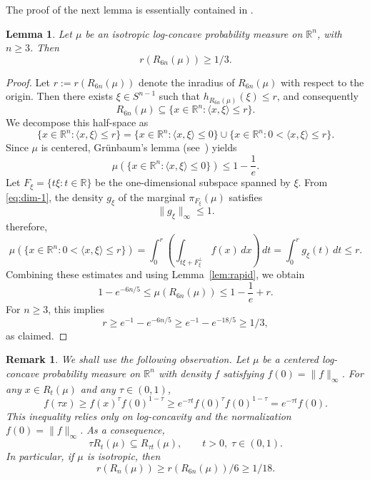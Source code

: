 \documentclass[11pt,leqno]{article}
\newtheorem{lemma}[theorem]{Lemma}
\newtheorem{remark}[theorem]{Remark}
\theoremstyle{remark}
\numberwithin{equation}{section}
\newcommand{\ls}{\leqslant}
\newcommand{\gr}{\geqslant}
\begin{document}
The proof of the next lemma is essentially contained in \cite[Lemma~5.4]{Klartag-2007}. 

\begin{lemma}\label{lem:inradius}
Let $\mu$ be an isotropic log-concave probability measure on $\mathbb{R}^n$, with $n\gr 3$. Then
$$r(R_{6n}(\mu))\gr 1/3.$$
\end{lemma}

\begin{proof}Let $r:=r(R_{6n}(\mu))$ denote the inradius of $R_{6n}(\mu)$ with respect to the origin. Then there exists $\xi\in S^{n-1}$ such that
$h_{R_{6n}(\mu)}(\xi)\ls r$, and consequently
$$R_{6n}(\mu)\subseteq \{x\in\mathbb{R}^n:\langle x,\xi\rangle \ls r\}.$$
We decompose this half-space as
$$\{x\in\mathbb{R}^n:\langle x,\xi\rangle \ls r\}=\{x\in\mathbb{R}^n:\langle x,\xi\rangle \ls 0\}\cup \{x\in\mathbb{R}^n:0<\langle x,\xi\rangle \ls r\}.$$
Since $\mu$ is centered, Gr\"{u}nbaum's lemma (see~\cite[Lemma~2.2.6]{BGVV-book}) yields 
$$\mu(\{x\in\mathbb{R}^n:\langle x,\xi\rangle\ls 0\})\ls 1-\frac{1}{e}.$$
Let $F_{\xi}=\{t\xi:t\in\mathbb{R}\}$ be the one-dimensional subspace spanned by $\xi$. From \eqref{eq:dim-1},
the density $g_{\xi}$ of the marginal $\pi_{F_{\xi}}(\mu)$ satisfies
\begin{equation*}\|g_{\xi}\|_{\infty}\ls 1.\end{equation*}
therefore,
$$\mu(\{x\in\mathbb{R}^n:0<\langle x,\xi\rangle\ls r\})=\int_0^r\left(\int_{t\xi +F_{\xi}^{\perp}}f(x)\,dx\right)\,dt=\int_0^rg_{\xi}(t)\,dt\ls r.$$
Combining these estimates and using Lemma~\ref{lem:rapid}, we obtain
$$1-e^{-6n/5}\ls \mu(R_{6n}(\mu))\ls 1-\frac{1}{e}+r.$$
For $n\gr 3$, this implies 
$$r\gr e^{-1}-e^{-6n/5}\gr e^{-1}-e^{-18/5}\gr 1/3,$$
as claimed.\end{proof}

\begin{remark}\label{rem:18}\rm We shall use the following observation. Let $\mu$ be a centered log-concave probability measure 
on $\mathbb{R}^n$ with density $f$ satisfying $f(0)=\|f\|_{\infty}$. For any $x\in R_t(\mu)$ and any $\tau\in (0,1)$, 
\begin{equation}\label{eq:scaling}f(\tau x)\gr f(x)^{\tau}f(0)^{1-\tau}\gr e^{-\tau t}f(0)^{\tau}f(0)^{1-\tau}=e^{-\tau t}f(0).\end{equation}
This inequality relies only on log-concavity and the normalization $f(0)=\|f\|_{\infty}$. As a consequence,
\begin{equation}\label{eq:R-concavity}\tau R_t(\mu)\subseteq R_{\tau t}(\mu),\qquad t>0,\;\tau\in (0,1).\end{equation}
In particular, if $\mu$ is isotropic, then 
$$r(R_n(\mu))\gr r(R_{6n}(\mu))/6\gr 1/18.$$
\end{remark}
\end{document}
